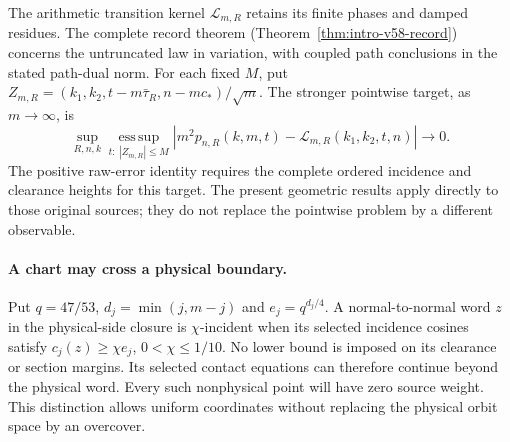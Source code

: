 The arithmetic transition kernel $\mathcal L_{m,R}$ retains its finite
phases and damped residues. The complete record theorem
(Theorem~\ref{thm:intro-v58-record}) concerns the untruncated law in
variation, with coupled path conclusions in the stated path-dual norm.
For each fixed $M$, put
$Z_{m,R}=(k_1,k_2,t-m\bar\tau_R,n-mc_*)/\sqrt m$.
The stronger pointwise target, as $m\to\infty$, is
\[
 \sup_{R,n,k}\operatorname*{ess\,sup}_{t:\ |Z_{m,R}|\le M}
 \left|m^2p_{n,R}(k,m,t)-\mathcal L_{m,R}(k_1,k_2,t,n)\right|
 \longrightarrow0.
\]
The positive raw-error identity requires the complete ordered incidence
and clearance heights for this target. The present geometric results
apply directly to those original sources; they do not replace the
pointwise problem by a different observable.

\paragraph{A chart may cross a physical boundary.}
Put $q=47/53$, $d_j=\min(j,m-j)$ and $e_j=q^{d_j/4}$. A
normal-to-normal word $z$ in the physical-side closure is
$\chi$-incident when its selected incidence cosines satisfy
$c_j(z)\ge\chi e_j$, $0<\chi\le1/10$. No lower bound is imposed
on its clearance or section margins. Its selected contact equations
can therefore continue beyond the physical word. Every such nonphysical
point will have zero source weight. This distinction allows uniform
coordinates without replacing the physical orbit space by an overcover.

